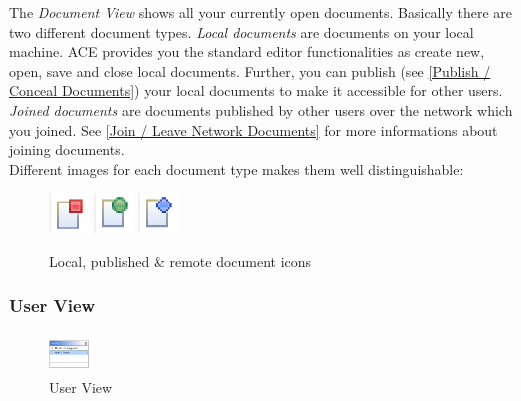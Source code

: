 \documentclass[11pt,a4paper]{article}
\begin{document}
The \textit{Document View} shows all your currently open documents. Basically there are two different document types. \textit{Local documents} are documents on your local machine. ACE provides you the standard editor functionalities as create new, open, save and close local documents. Further, you can publish (see \ref{Publish / Conceal Documents}) your local documents to make it accessible for other users. \textit{Joined documents} are documents published by other users over the network which you joined. See \ref{Join / Leave Network Documents} for more informations about joining documents.
\\
Different images for each document type makes them well distinguishable:

\begin{figure}[htbp]
\begin{center}
  \includegraphics[height=30pt, width=30pt]{../images/usermanual/icon_local.bmp.eps}
\vspace{9pt}
  \includegraphics[height=30pt, width=30pt]{../images/usermanual/icon_published.bmp.eps}
\vspace{9pt}
  \includegraphics[height=30pt, width=30pt]{../images/usermanual/icon_remote.bmp.eps}
\caption{Local, published \& remote document icons}
\label{default}
\end{center}
\end{figure}

\subsubsection{User View}
\begin{figure}[htbp]
\begin{center}
  \includegraphics[height=30pt, width=30pt]{../images/usermanual/uview_overview.bmp.eps}
\caption{User View}
\label{default}
\end{center}
\end{figure}
\end{document}
